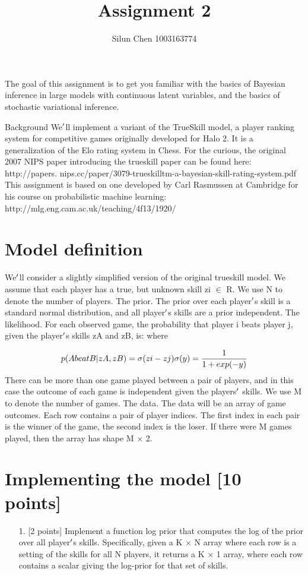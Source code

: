 \documentclass[12pt,a4paper]{article}
\title{ Assignment 2 }
\author{ Silun Chen 1003163774 }
\begin{document}
\maketitle

The goal of this assignment is to get you familiar with the basics of Bayesian inference in large models with continuous latent variables, and the basics of stochastic variational inference.

Background We\ensuremath{\rq}ll implement a variant of the TrueSkill model, a player ranking system for competitive games originally developed for Halo 2. It is a generalization of the Elo rating system in Chess. For the curious, the original 2007 NIPS paper introducing the trueskill paper can be found here: http://papers. nips.cc/paper/3079-trueskilltm-a-bayesian-skill-rating-system.pdf This assignment is based on one developed by Carl Rasmussen at Cambridge for his course on probabilistic machine learning: http://mlg.eng.cam.ac.uk/teaching/4f13/1920/

\section{Model definition}
We\ensuremath{\rq}ll consider a slightly simplified version of the original trueskill model. We assume that each player has a true, but unknown skill zi \ensuremath{\in} R. We use N to denote the number of players. The prior. The prior over each player\ensuremath{\rq}s skill is a standard normal distribution, and all player\ensuremath{\rq}s skills are a prior independent. The likelihood. For each observed game, the probability that player i beats player j, given the player\ensuremath{\rq}s skills zA and zB, is: where

\[
p(AbeatB|zA,zB)=\sigma(zi - zj)\\
\sigma(y) = \frac{1}{1 + exp(- y)}
\]
There can be more than one game played between a pair of players, and in this case the outcome of each game is independent given the players\ensuremath{\rq} skills. We use M to denote the number of games. The data. The data will be an array of game outcomes. Each row contains a pair of player indices. The first index in each pair is the winner of the game, the second index is the loser. If there were M games played, then the array has shape M \ensuremath{\times} 2.

\section{Implementing the model [10 points]}
\begin{itemize}
\item[1. ] [2 points] Implement a function log prior that computes the log of the prior over all player\ensuremath{\rq}s skills. Specifically, given a K \ensuremath{\times} N array where each row is a setting of the skills for all N players, it returns a K \ensuremath{\times} 1 array, where each row contains a scalar giving the log-prior for that set of skills.

\end{itemize}
\end{document}

